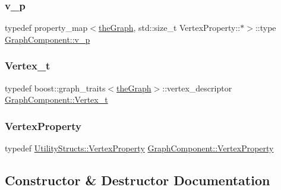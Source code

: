 \subsubsection{\texorpdfstring{v\+\_\+p}{v\_p}}
{\footnotesize\ttfamily typedef property\+\_\+map$<$\hyperlink{class_graph_component_a982e0748a6e1b8dc74986f5f8b3dca5c}{the\+Graph}, std\+::size\+\_\+t Vertex\+Property\+::$\ast$$>$\+::type \hyperlink{class_graph_component_ad40772702161324303e24463a63738e9}{Graph\+Component\+::v\+\_\+p}}

\mbox{\label{class_graph_component_ae67114a6ce5a001dc35e1996e1b45aa0}} 
\subsubsection{\texorpdfstring{Vertex\+\_\+t}{Vertex\_t}}
{\footnotesize\ttfamily typedef boost\+::graph\+\_\+traits$<$\hyperlink{class_graph_component_a982e0748a6e1b8dc74986f5f8b3dca5c}{the\+Graph}$>$\+::vertex\+\_\+descriptor \hyperlink{class_graph_component_ae67114a6ce5a001dc35e1996e1b45aa0}{Graph\+Component\+::\+Vertex\+\_\+t}}

\mbox{\label{class_graph_component_a7c0fcb3f03bf188b7df520e0cdd364b7}} 
\subsubsection{\texorpdfstring{Vertex\+Property}{VertexProperty}}
{\footnotesize\ttfamily typedef \hyperlink{struct_utility_structs_1_1_vertex_property}{Utility\+Structs\+::\+Vertex\+Property} \hyperlink{class_graph_component_a7c0fcb3f03bf188b7df520e0cdd364b7}{Graph\+Component\+::\+Vertex\+Property}}



\subsection{Constructor \& Destructor Documentation}
\mbox{\label{class_graph_component_a35c4a6e5c6f28751b1bd6c451cc07957}} 
